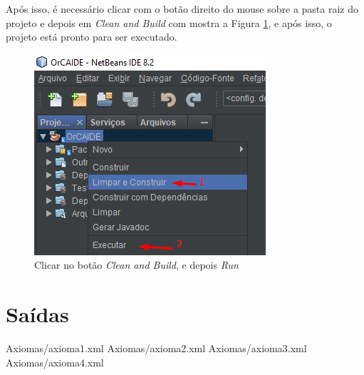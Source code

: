 \documentclass{bcc}
\begin{document}
Após isso, é necessário clicar com o botão direito do mouse sobre a pasta raiz do projeto e depois em \textit{Clean and Build} com mostra a Figura \ref{fig:install6}, e após isso, o projeto está pronto para ser executado.

\begin{figure}[H]
\centering
\includegraphics[width=.6\textwidth]{Figuras/install6.png}
\caption{Clicar no botão \textit{Clean and Build}, e depois \textit{Run}} 
\label{fig:install6}
\end{figure}

\section{Saídas}
 {Axiomas/axioma1.xml}
 {Axiomas/axioma2.xml}
 {Axiomas/axioma3.xml}
 {Axiomas/axioma4.xml}
\end{document}
